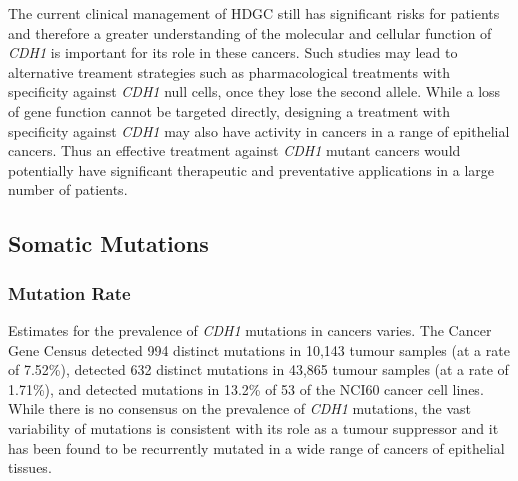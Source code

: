 The current clinical management of \gls{HDGC} still has significant risks for patients and therefore a greater understanding of the molecular and cellular function of \textit{CDH1} is important for its role in these cancers. Such studies may lead to alternative treament strategies such as pharmacological \glspl{treatment} with specificity against \textit{CDH1} null cells, once they lose the second \gls{allele}. While a loss of gene function cannot be targeted directly, designing a treatment with specificity against \textit{CDH1} may also have activity in  cancers in a range of epithelial cancers. Thus an effective treatment against \textit{CDH1} \gls{mutant} cancers would potentially have significant therapeutic and preventative applications in a large number of patients.

\iffalse
\subsection{Somatic Mutations}
\subsubsection{Mutation Rate}

Estimates for the prevalence of \textit{CDH1}  \glspl{mutation}  in  cancers varies. The Cancer Gene Census \citep{Futreal2004, Pleasance2010} detected 994 distinct \glspl{mutation} in 10,143 tumour samples (at a rate of 7.52\%), \citet{COSMICdb} detected 632 distinct \glspl{mutation} in 43,865 tumour samples (at a rate of 1.71\%), and detected \glspl{mutation} in 13.2\% of 53 of the NCI60 cancer cell lines. While there is no consensus on the prevalence of \textit{CDH1} \glspl{mutation}, the vast variability of \glspl{mutation} is consistent with its role as a \gls{tumour suppressor} and it has been found to be recurrently mutated in a wide range of cancers of epithelial tissues.

